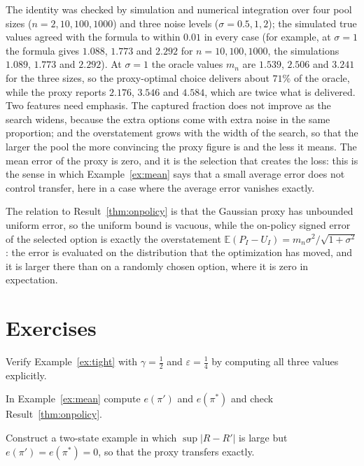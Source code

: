 The identity was checked by simulation and numerical integration over four pool sizes ($n=2,10,100,1000$) and three noise levels ($\sigma=0.5,1,2$); the simulated true values agreed with the formula to within $0.01$ in every case (for example, at $\sigma=1$ the formula gives $1.088$, $1.773$ and $2.292$ for $n=10,100,1000$, the simulations $1.089$, $1.773$ and $2.292$). At $\sigma=1$ the oracle values $m_n$ are $1.539$, $2.506$ and $3.241$ for the three sizes, so the proxy-optimal choice delivers about $71\%$ of the oracle, while the proxy reports $2.176$, $3.546$ and $4.584$, which are twice what is delivered. Two features need emphasis. The captured fraction does not improve as the search widens, because the extra options come with extra noise in the same proportion; and the overstatement grows with the width of the search, so that the larger the pool the more convincing the proxy figure is and the less it means. The mean error of the proxy is zero, and it is the selection that creates the loss: this is the sense in which Example~\ref{ex:mean} says that a small average error does not control transfer, here in a case where the average error vanishes exactly.

The relation to Result~\ref{thm:onpolicy} is that the Gaussian proxy has unbounded uniform error, so the uniform bound is vacuous, while the on-policy signed error of the selected option is exactly the overstatement $\mathbb E(P_I-U_I)=m_n\sigma^2/\sqrt{1+\sigma^2}$: the error is evaluated on the distribution that the optimization has moved, and it is larger there than on a randomly chosen option, where it is zero in expectation.

\section*{Exercises}

\begin{exercise}
Verify Example~\ref{ex:tight} with $\gamma=\tfrac12$ and $\varepsilon=\tfrac14$ by computing all three values explicitly.
\end{exercise}

\begin{exercise}
In Example~\ref{ex:mean} compute $e(\pi')$ and $e(\pi^*)$ and check Result~\ref{thm:onpolicy}.
\end{exercise}

\begin{exercise}
Construct a two-state example in which $\sup|R-R'|$ is large but $e(\pi')=e(\pi^*)=0$, so that the proxy transfers exactly.
\end{exercise}

